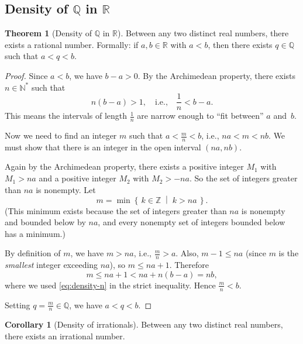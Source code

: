 \documentclass[12pt,a4paper,openany]{book}
\newcommand{\N}{\mathbb{N}}
\newcommand{\Z}{\mathbb{Z}}
\newcommand{\Q}{\mathbb{Q}}
\newcommand{\R}{\mathbb{R}}
\newcommand{\setcond}[2]{\left\{\,#1\;\middle|\;#2\,\right\}}
\theoremstyle{definition}
\newtheorem{theorem}{Theorem}[chapter]
\newtheorem{corollary}{Corollary}[chapter]
\theoremstyle{remark}
\begin{document}
\subsection{Density of \texorpdfstring{$\Q$}{Q} in
\texorpdfstring{$\R$}{R}}
\label{subsec:density-Q}
\index{density!of $\Q$ in $\R$}

\begin{theorem}[Density of $\Q$ in $\R$]\label{thm:density-Q}
Between any two distinct real numbers, there exists a rational number.
Formally: if $a, b \in \R$ with $a < b$, then there exists $q \in \Q$ such
that $a < q < b$.
\end{theorem}

\begin{proof}
Since $a < b$, we have $b - a > 0$.  By the Archimedean property, there
exists $n \in \N^*$ such that
\begin{equation}\label{eq:density-n}
  n(b-a) > 1, \quad\text{i.e.,}\quad \frac{1}{n} < b - a.
\end{equation}
This means the intervals of length $\frac{1}{n}$ are narrow enough to ``fit
between'' $a$ and~$b$.

Now we need to find an integer $m$ such that $a < \frac{m}{n} < b$, i.e.,
$na < m < nb$.  We must show that there is an integer in the open interval
$(na, nb)$.

Again by the Archimedean property, there exists a positive integer $M_1$
with $M_1 > na$ and a positive integer $M_2$ with $M_2 > -na$.  So the set
of integers greater than $na$ is nonempty.  Let
\[
  m = \min\setcond{k \in \Z}{k > na}.
\]
(This minimum exists because the set of integers greater than $na$ is
nonempty and bounded below by $na$, and every nonempty set of integers
bounded below has a minimum.)

By definition of $m$, we have $m > na$, i.e., $\frac{m}{n} > a$.  Also,
$m - 1 \leq na$ (since $m$ is the \emph{smallest} integer exceeding $na$),
so $m \leq na + 1$.  Therefore
\[
  m \leq na + 1 < na + n(b-a) = nb,
\]
where we used \eqref{eq:density-n} in the strict inequality.  Hence
$\frac{m}{n} < b$.

Setting $q = \frac{m}{n} \in \Q$, we have $a < q < b$.
\end{proof}

\begin{corollary}[Density of irrationals]\label{cor:density-irr}
Between any two distinct real numbers, there exists an irrational number.
\end{corollary}
\end{document}
